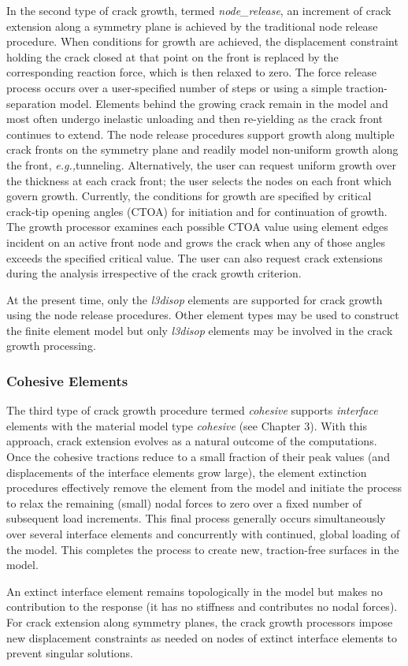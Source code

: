 \documentclass[11pt]{report}
\numberwithin{equation}{section}
\newcommand{\eg}{\textit{e.g.,\xspace}}
\begin{document}
In the second type of crack growth, termed \textit{node\_release}, an increment of crack
extension along a symmetry plane is achieved by the traditional node release
procedure. When conditions for growth are achieved, the displacement constraint
holding the crack closed at that point on the front is replaced by the
corresponding reaction force, which is then relaxed to zero. The force release
process occurs over a user-specified number of steps or using a simple
traction-separation model. Elements behind the growing crack remain in the model
and most often undergo inelastic unloading and then re-yielding as the crack
front continues to extend. The node release procedures support growth along
multiple crack fronts on the symmetry plane and readily model non-uniform growth
along the front, \eg tunneling. Alternatively, the user can request uniform
growth over the thickness at each crack front; the user selects the nodes on
each front which govern growth. Currently, the conditions for growth are
specified by critical crack-tip opening angles (CTOA) for initiation and for
continuation of growth. The growth processor examines each possible CTOA value
using element edges incident on an active front node and grows the crack when
any of those angles exceeds the specified critical value. The user can also
request crack extensions during the analysis irrespective of the crack growth
criterion.

At the present time, only the \textit{l3disop} elements are supported for crack growth
using the node release procedures. Other element types may be used to construct
the finite element model but only \textit{l3disop} elements may be involved in the crack
growth processing.

\subsubsection{Cohesive Elements}

The third type of crack growth procedure termed \textit{cohesive} supports 
\textit{interface}
elements with the material model type \textit{cohesive} (see Chapter 3). 
With this approach, crack extension
evolves as a natural outcome of the computations. Once the cohesive tractions
reduce to a small fraction of their peak values (and displacements of 
the interface elements grow 
large), the element extinction procedures effectively remove the
element from the model and initiate the process to relax the remaining (small)
nodal forces to zero over a fixed number of subsequent load increments.  This
final process generally occurs simultaneously over several interface elements
and concurrently with continued, global loading of the model. This completes the
process to create new, traction-free surfaces in the model.

An extinct 
interface element remains topologically in the model but makes no contribution to
the response (it has no stiffness and contributes no nodal forces). 
For crack extension along symmetry planes, the crack growth processors impose
new displacement constraints as needed on nodes of extinct interface elements
to prevent singular solutions.
\end{document}
